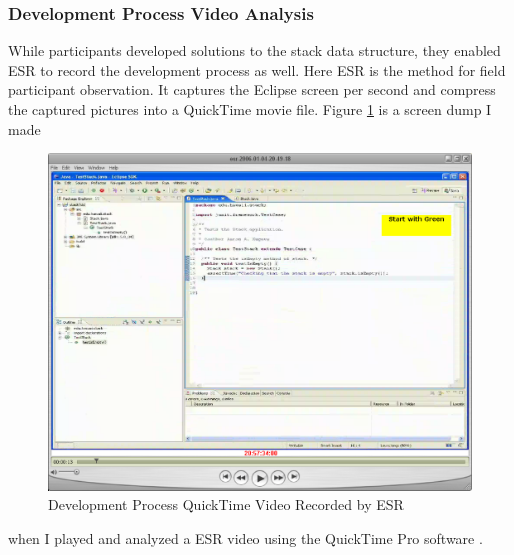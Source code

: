 \subsubsection{Development Process Video Analysis}
While participants developed solutions to the stack data structure,
they enabled ESR to record the development process as well. Here ESR
is the method for field participant observation. It captures the
Eclipse screen per second and compress the captured pictures into a
QuickTime movie file. Figure \ref{fig:EsrVideo} is a screen dump I made 
\begin{figure}[htbp]
  \centering
  \includegraphics[width=1.0\textwidth]{figs/ESR-Video}
  \caption{Development Process QuickTime Video Recorded by ESR}\label{fig:EsrVideo}
\end{figure}
when I played and analyzed a ESR video using the QuickTime Pro software
\cite{QuickTime}.

